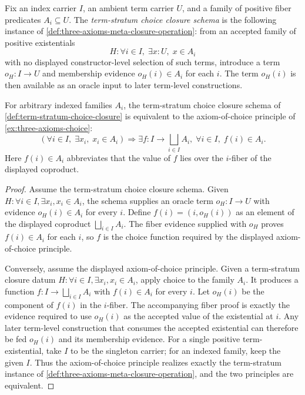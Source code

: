 \begin{definition}
\label{def:term-stratum-choice-closure}
Fix an index carrier $I$, an ambient term carrier $U$, and a family of positive fiber predicates $A_i \subseteq U$. The \emph{term-stratum choice closure schema} is the following instance of \autoref{def:three-axioms-meta-closure-operation}: from an accepted family of positive existentials
$$
H:\forall i \in I,\; \exists x:U,\; x \in A_i
$$
with no displayed constructor-level selection of such terms, introduce a term $o_H:I\to U$ and membership evidence $o_H(i)\in A_i$ for each $i$. The term $o_H(i)$ is then available as an oracle input to later term-level constructions.
\end{definition}

\begin{theorem}
\label{thm:choice-term-stratum-meta-closure}
For arbitrary indexed families $A_i$, the term-stratum choice closure schema of \autoref{def:term-stratum-choice-closure} is equivalent to the axiom-of-choice principle of \autoref{ex:three-axioms-choice}:
$$
\left(\forall i \in I,\; \exists x_i,\; x_i \in A_i\right)
\Longrightarrow
\exists f:I\to\bigsqcup_{i\in I} A_i,\; \forall i\in I,\; f(i)\in A_i.
$$
Here $f(i)\in A_i$ abbreviates that the value of $f$ lies over the $i$-fiber of the displayed coproduct.
\end{theorem}

\begin{proof}
Assume the term-stratum choice closure schema. Given $H:\forall i\in I,\exists x_i, x_i\in A_i$, the schema supplies an oracle term $o_H:I\to U$ with evidence $o_H(i)\in A_i$ for every $i$. Define $f(i)=(i,o_H(i))$ as an element of the displayed coproduct $\bigsqcup_{i\in I}A_i$. The fiber evidence supplied with $o_H$ proves $f(i)\in A_i$ for each $i$, so $f$ is the choice function required by the displayed axiom-of-choice principle.

Conversely, assume the displayed axiom-of-choice principle. Given a term-stratum closure datum $H:\forall i\in I,\exists x_i,x_i\in A_i$, apply choice to the family $A_i$. It produces a function $f:I\to\bigsqcup_{i\in I}A_i$ with $f(i)\in A_i$ for every $i$. Let $o_H(i)$ be the component of $f(i)$ in the $i$-fiber. The accompanying fiber proof is exactly the evidence required to use $o_H(i)$ as the accepted value of the existential at $i$. Any later term-level construction that consumes the accepted existential can therefore be fed $o_H(i)$ and its membership evidence. For a single positive term-existential, take $I$ to be the singleton carrier; for an indexed family, keep the given $I$. Thus the axiom-of-choice principle realizes exactly the term-stratum instance of \autoref{def:three-axioms-meta-closure-operation}, and the two principles are equivalent.
\end{proof}


